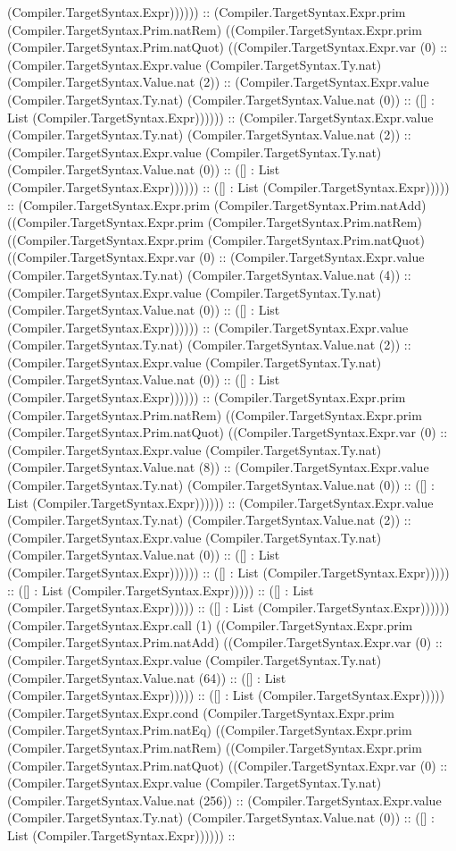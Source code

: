 \documentclass[11pt]{article}
\begin{document}
(Compiler.TargetSyntax.Expr)))))) :: (Compiler.TargetSyntax.Expr.prim (Compiler.TargetSyntax.Prim.natRem) ((Compiler.TargetSyntax.Expr.prim (Compiler.TargetSyntax.Prim.natQuot) ((Compiler.TargetSyntax.Expr.var (0) :: (Compiler.TargetSyntax.Expr.value (Compiler.TargetSyntax.Ty.nat) (Compiler.TargetSyntax.Value.nat (2)) :: (Compiler.TargetSyntax.Expr.value (Compiler.TargetSyntax.Ty.nat) (Compiler.TargetSyntax.Value.nat (0)) :: ([] : List (Compiler.TargetSyntax.Expr)))))) :: (Compiler.TargetSyntax.Expr.value (Compiler.TargetSyntax.Ty.nat) (Compiler.TargetSyntax.Value.nat (2)) :: (Compiler.TargetSyntax.Expr.value (Compiler.TargetSyntax.Ty.nat) (Compiler.TargetSyntax.Value.nat (0)) :: ([] : List (Compiler.TargetSyntax.Expr)))))) :: ([] : List (Compiler.TargetSyntax.Expr))))) :: (Compiler.TargetSyntax.Expr.prim (Compiler.TargetSyntax.Prim.natAdd) ((Compiler.TargetSyntax.Expr.prim (Compiler.TargetSyntax.Prim.natRem) ((Compiler.TargetSyntax.Expr.prim (Compiler.TargetSyntax.Prim.natQuot) ((Compiler.TargetSyntax.Expr.var (0) :: (Compiler.TargetSyntax.Expr.value (Compiler.TargetSyntax.Ty.nat) (Compiler.TargetSyntax.Value.nat (4)) :: (Compiler.TargetSyntax.Expr.value (Compiler.TargetSyntax.Ty.nat) (Compiler.TargetSyntax.Value.nat (0)) :: ([] : List (Compiler.TargetSyntax.Expr)))))) :: (Compiler.TargetSyntax.Expr.value (Compiler.TargetSyntax.Ty.nat) (Compiler.TargetSyntax.Value.nat (2)) :: (Compiler.TargetSyntax.Expr.value (Compiler.TargetSyntax.Ty.nat) (Compiler.TargetSyntax.Value.nat (0)) :: ([] : List (Compiler.TargetSyntax.Expr)))))) :: (Compiler.TargetSyntax.Expr.prim (Compiler.TargetSyntax.Prim.natRem) ((Compiler.TargetSyntax.Expr.prim (Compiler.TargetSyntax.Prim.natQuot) ((Compiler.TargetSyntax.Expr.var (0) :: (Compiler.TargetSyntax.Expr.value (Compiler.TargetSyntax.Ty.nat) (Compiler.TargetSyntax.Value.nat (8)) :: (Compiler.TargetSyntax.Expr.value (Compiler.TargetSyntax.Ty.nat) (Compiler.TargetSyntax.Value.nat (0)) :: ([] : List (Compiler.TargetSyntax.Expr)))))) :: (Compiler.TargetSyntax.Expr.value (Compiler.TargetSyntax.Ty.nat) (Compiler.TargetSyntax.Value.nat (2)) :: (Compiler.TargetSyntax.Expr.value (Compiler.TargetSyntax.Ty.nat) (Compiler.TargetSyntax.Value.nat (0)) :: ([] : List (Compiler.TargetSyntax.Expr)))))) :: ([] : List (Compiler.TargetSyntax.Expr))))) :: ([] : List (Compiler.TargetSyntax.Expr))))) :: ([] : List (Compiler.TargetSyntax.Expr))))) :: ([] : List (Compiler.TargetSyntax.Expr)))))) (Compiler.TargetSyntax.Expr.call (1) ((Compiler.TargetSyntax.Expr.prim (Compiler.TargetSyntax.Prim.natAdd) ((Compiler.TargetSyntax.Expr.var (0) :: (Compiler.TargetSyntax.Expr.value (Compiler.TargetSyntax.Ty.nat) (Compiler.TargetSyntax.Value.nat (64)) :: ([] : List (Compiler.TargetSyntax.Expr))))) :: ([] : List (Compiler.TargetSyntax.Expr))))) (Compiler.TargetSyntax.Expr.cond (Compiler.TargetSyntax.Expr.prim (Compiler.TargetSyntax.Prim.natEq) ((Compiler.TargetSyntax.Expr.prim (Compiler.TargetSyntax.Prim.natRem) ((Compiler.TargetSyntax.Expr.prim (Compiler.TargetSyntax.Prim.natQuot) ((Compiler.TargetSyntax.Expr.var (0) :: (Compiler.TargetSyntax.Expr.value (Compiler.TargetSyntax.Ty.nat) (Compiler.TargetSyntax.Value.nat (256)) :: (Compiler.TargetSyntax.Expr.value (Compiler.TargetSyntax.Ty.nat) (Compiler.TargetSyntax.Value.nat (0)) :: ([] : List (Compiler.TargetSyntax.Expr)))))) :: 
\end{document}
